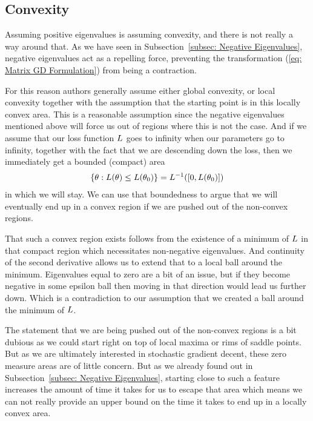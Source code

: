 \subsection{Convexity}

Assuming positive eigenvalues is assuming convexity, and there is not really a
way around that. As we have seen in Subsection~\ref{subsec: Negative
Eigenvalues}, negative eigenvalues act as a repelling force, preventing the
transformation (\ref{eq: Matrix GD Formulation}) from being a contraction.

For this reason authors generally assume either global convexity, or local
convexity together with the assumption that the starting point is in this
locally convex area. This is a reasonable assumption since the negative
eigenvalues mentioned above will force us out of regions where this is not
the case. And if we assume that our loss function \(L\) goes to infinity when
our parameters go to infinity, together with the fact that we are descending
down the loss, then we immediately get a bounded (compact) area 
%
\begin{align*}
	\{\theta : L(\theta) \le L(\theta_0)\} = L^{-1}([0, L(\theta_0)])
\end{align*}
%
in which we will stay. We can use that boundedness to argue that we will
eventually end up in a convex region if we are pushed out of the non-convex
regions.

That such a convex region exists follows from the existence of a minimum of
\(L\) in that compact region which necessitates non-negative
eigenvalues. And continuity of the second derivative allows us to extend that to 
a local ball around the minimum. Eigenvalues equal to zero
are a bit of an issue, but if they become negative in some epsilon ball
then moving in that direction would lead us further down. Which is a contradiction
to our assumption that we created a ball around the minimum of \(L\).

The statement that we are being pushed out of the non-convex regions is a bit
dubious as we could start right on top of local maxima or rims of saddle points.
But as we are ultimately interested in stochastic gradient decent, these zero
measure areas are of little concern. But as we already found out in
Subsection~\ref{subsec: Negative Eigenvalues}, starting close to such a feature
increases the amount of time it takes for us to escape that area which means
we can not really provide an upper bound on the time it takes to end up in
a locally convex area.

